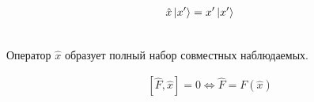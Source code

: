 \newpage
{}
\begin{align*}
& \hat{x}\left| x' \right \rangle = x' \left| x' \right \rangle
\end{align*}
\begin{Prop}
~
\\
Оператор $\hat{x}$ образует полный набор совместных наблюдаемых.
\end{Prop}
\begin{Note}
\begin{align*}
& \left[\hat{F}, \hat{x}\right] = 0 \Leftrightarrow \hat{F} = F\left(\hat{x}\right)
\end{align*}
\end{Note}